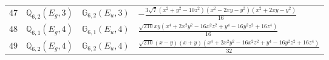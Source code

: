 \documentclass[fleqn,8pt,landscape]{jsarticle}
\begin{document}
\begin{table}[ht!]
\begin{center}
\begin{tabular}{cccl}
$ 47 $ & $ \mathbb{Q}_{6,2}(E_{g},3) $ & $ \mathbb{G}_{6,2}(E_{u},3) $ & $ - \frac{3 \sqrt{7} \left(x^{2} + y^{2} - 10 z^{2}\right) \left(x^{2} - 2 x y - y^{2}\right) \left(x^{2} + 2 x y - y^{2}\right)}{16} $ \\
$ 48 $ & $ \mathbb{Q}_{6,1}(E_{g},4) $ & $ \mathbb{G}_{6,1}(E_{u},4) $ & $ \frac{\sqrt{210} x y \left(x^{4} + 2 x^{2} y^{2} - 16 x^{2} z^{2} + y^{4} - 16 y^{2} z^{2} + 16 z^{4}\right)}{16} $ \\
$ 49 $ & $ \mathbb{Q}_{6,2}(E_{g},4) $ & $ \mathbb{G}_{6,2}(E_{u},4) $ & $ \frac{\sqrt{210} \left(x - y\right) \left(x + y\right) \left(x^{4} + 2 x^{2} y^{2} - 16 x^{2} z^{2} + y^{4} - 16 y^{2} z^{2} + 16 z^{4}\right)}{32} $ \\
 \hline \hline
\end{tabular}
\end{center}
\end{table}
\end{document}
